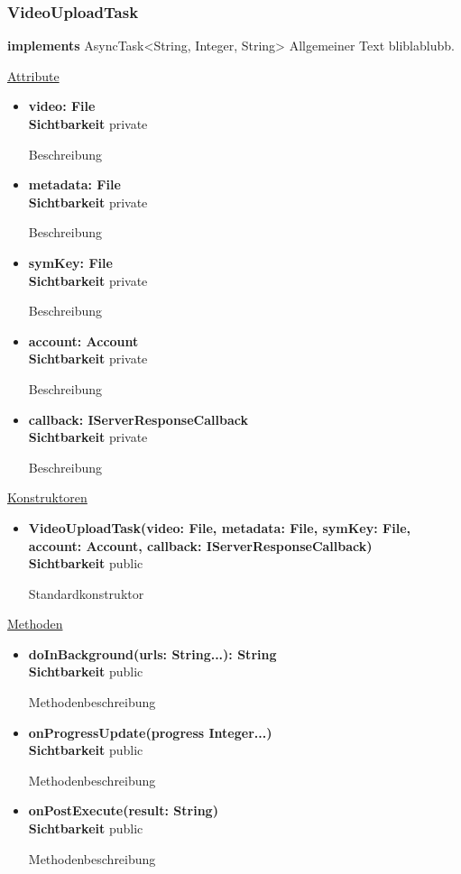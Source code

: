 \subsubsection{VideoUploadTask}
\textbf{implements} AsyncTask<String, Integer, String> \newline
Allgemeiner Text bliblablubb. \newline

\underline{Attribute}
\begin{itemize}
\itemsep0pt
\item \textbf{video: File} \hfill\\ 
\textbf{Sichtbarkeit} private

Beschreibung

\item \textbf{metadata: File} \hfill\\ 
\textbf{Sichtbarkeit} private

Beschreibung

\item \textbf{symKey: File} \hfill\\ 
\textbf{Sichtbarkeit} private

Beschreibung

\item \textbf{account: Account} \hfill\\ 
\textbf{Sichtbarkeit} private

Beschreibung

\item \textbf{callback: IServerResponseCallback} \hfill\\ 
\textbf{Sichtbarkeit} private

Beschreibung
\end{itemize}

\underline{Konstruktoren}
\begin{itemize}
\itemsep0pt
\item \textbf{VideoUploadTask(video: File, metadata: File, symKey: File, account: Account, callback: IServerResponseCallback)} \hfill\\
\textbf{Sichtbarkeit} public

Standardkonstruktor
\end{itemize}

\underline{Methoden}
\begin{itemize}
\itemsep0pt
\item \textbf{doInBackground(urls: String...): String}\hfill\\
\textbf{Sichtbarkeit} public

Methodenbeschreibung

\item \textbf{onProgressUpdate(progress Integer...)}\hfill\\
\textbf{Sichtbarkeit} public

Methodenbeschreibung

\item \textbf{onPostExecute(result: String)}\hfill\\
\textbf{Sichtbarkeit} public

Methodenbeschreibung
\end{itemize}